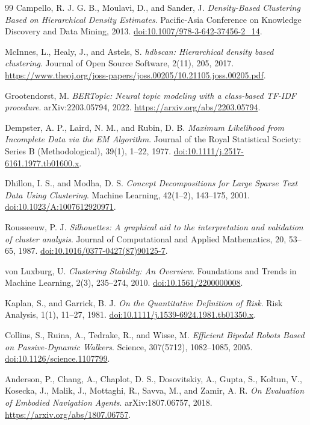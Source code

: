 \documentclass[11pt]{article}
\begin{document}
\begin{thebibliography}{99}
Campello, R. J. G. B., Moulavi, D., and Sander, J. \textit{Density-Based Clustering Based on Hierarchical Density Estimates}. Pacific-Asia Conference on Knowledge Discovery and Data Mining, 2013. \href{https://doi.org/10.1007/978-3-642-37456-2_14}{doi:10.1007/978-3-642-37456-2\_14}.

McInnes, L., Healy, J., and Astels, S. \textit{hdbscan: Hierarchical density based clustering}. Journal of Open Source Software, 2(11), 205, 2017. \url{https://www.theoj.org/joss-papers/joss.00205/10.21105.joss.00205.pdf}.

Grootendorst, M. \textit{BERTopic: Neural topic modeling with a class-based TF-IDF procedure}. arXiv:2203.05794, 2022. \url{https://arxiv.org/abs/2203.05794}.

Dempster, A. P., Laird, N. M., and Rubin, D. B. \textit{Maximum Likelihood from Incomplete Data via the EM Algorithm}. Journal of the Royal Statistical Society: Series B (Methodological), 39(1), 1--22, 1977. \href{https://doi.org/10.1111/j.2517-6161.1977.tb01600.x}{doi:10.1111/j.2517-6161.1977.tb01600.x}.

Dhillon, I. S., and Modha, D. S. \textit{Concept Decompositions for Large Sparse Text Data Using Clustering}. Machine Learning, 42(1--2), 143--175, 2001. \href{https://doi.org/10.1023/A:1007612920971}{doi:10.1023/A:1007612920971}.

Rousseeuw, P. J. \textit{Silhouettes: A graphical aid to the interpretation and validation of cluster analysis}. Journal of Computational and Applied Mathematics, 20, 53--65, 1987. \href{https://doi.org/10.1016/0377-0427(87)90125-7}{doi:10.1016/0377-0427(87)90125-7}.

von Luxburg, U. \textit{Clustering Stability: An Overview}. Foundations and Trends in Machine Learning, 2(3), 235--274, 2010. \href{https://doi.org/10.1561/2200000008}{doi:10.1561/2200000008}.

Kaplan, S., and Garrick, B. J. \textit{On the Quantitative Definition of Risk}. Risk Analysis, 1(1), 11--27, 1981. \href{https://doi.org/10.1111/j.1539-6924.1981.tb01350.x}{doi:10.1111/j.1539-6924.1981.tb01350.x}.

Collins, S., Ruina, A., Tedrake, R., and Wisse, M. \textit{Efficient Bipedal Robots Based on Passive-Dynamic Walkers}. Science, 307(5712), 1082--1085, 2005. \href{https://doi.org/10.1126/science.1107799}{doi:10.1126/science.1107799}.

Anderson, P., Chang, A., Chaplot, D. S., Dosovitskiy, A., Gupta, S., Koltun, V., Kosecka, J., Malik, J., Mottaghi, R., Savva, M., and Zamir, A. R. \textit{On Evaluation of Embodied Navigation Agents}. arXiv:1807.06757, 2018. \url{https://arxiv.org/abs/1807.06757}.
\end{thebibliography}
\end{document}
